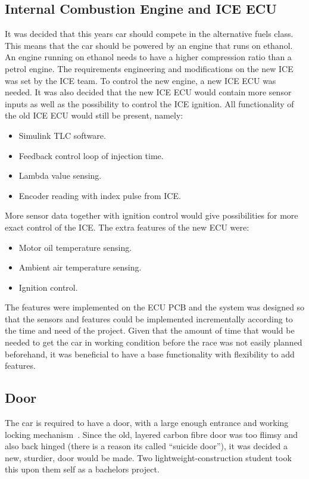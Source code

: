\subsection{Internal Combustion Engine and ICE ECU}
It was decided that this years car should compete in the alternative fuels
class. This means that the car should be powered by an engine that runs on
ethanol. An engine running on ethanol needs to have a higher compression ratio than
a petrol engine.
The requirements engineering and modifications on the new ICE was set by the ICE
team. To control the new engine, a new ICE ECU was needed. It was also decided
that the new ICE ECU would contain more sensor inputs as well as the possibility
to control the ICE ignition. All functionality of the old ICE ECU would still be
present, namely:
\begin{itemize}
    \item Simulink TLC software.
    \item Feedback control loop of injection time.
    \item Lambda value sensing.
    \item Encoder reading with index pulse from ICE\@.
\end{itemize}
More sensor data together with ignition control would give possibilities
for more exact control of the ICE\@. The extra features of the new ECU were:
\begin{itemize}
    \item Motor oil temperature sensing.
    \item Ambient air temperature sensing.
    \item Ignition control.
\end{itemize}
The features were implemented on the ECU PCB and the system was designed so that
the sensors and features could be implemented incrementally according to the
time and need of the project. Given that the amount of time that would be needed
to get the car in working condition before the race was not easily planned
beforehand, it was beneficial to have a base functionality with flexibility to
add features.

\subsection{Door}
The car is required to have a door, with a large enough entrance and working
locking mechanism~\cite{semrules16c1}. Since the old, layered carbon fibre door
was too flimsy and also back hinged (there is a reason its called ``suicide door''),
it was decided a new, sturdier, door would be made. Two lightweight-construction
student took this upon them self as a bachelors project. 

